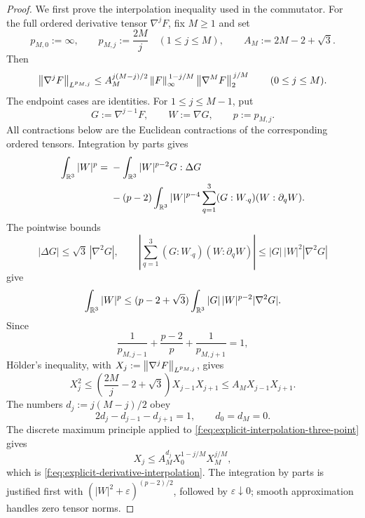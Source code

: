 \begin{proof}
We first prove the interpolation inequality used in the commutator.  For the
full ordered derivative tensor \(\nabla^jF\), fix \(M\ge1\) and set
\[
 p_{M,0}:=\infty,
 \qquad
 p_{M,j}:=\frac{2M}{j}\quad(1\le j\le M),
 \qquad
 A_M:=2M-2+\sqrt3.
\]
Then
\begin{equation}
 \left\lVert \nabla^jF\right\rVert_{L^{p_{M,j}}}
 \le A_M^{j(M-j)/2}
 \left\lVert F\right\rVert_\infty^{\,1-j/M}
 \left\lVert \nabla^MF\right\rVert_2^{\,j/M}
 \qquad(0\le j\le M).
 \label{f:eq:explicit-derivative-interpolation}
\end{equation}
The endpoint cases are identities.  For \(1\le j\le M-1\), put
\[
 G:=\nabla^{j-1}F,
 \qquad W:=\nabla G,
 \qquad p:=p_{M,j}.
\]
All contractions below are the Euclidean contractions of the corresponding
ordered tensors.  Integration by parts gives
\begin{align*}
 \int_{\mathbb R^3}|W|^p
 ={}&-\int_{\mathbb R^3}|W|^{p-2}G:\Delta G\\
 &-(p-2)\int_{\mathbb R^3}|W|^{p-4}
   \sum_{q=1}^3(G:W_{\cdot q})(W:\partial_qW).
\end{align*}
The pointwise bounds
\[
 |\Delta G|\le\sqrt3\,|\nabla^2G|,
 \qquad
 \left|\sum_{q=1}^3(G:W_{\cdot q})(W:\partial_qW)\right|
 \le |G|\,|W|^2|\nabla^2G|
\]
give
\[
 \int_{\mathbb R^3}|W|^p
 \le(p-2+\sqrt3)
 \int_{\mathbb R^3}|G|\,|W|^{p-2}|\nabla^2G|.
\]
Since
\[
 \frac1{p_{M,j-1}}+\frac{p-2}{p}
 +\frac1{p_{M,j+1}}=1,
\]
H\"older's inequality, with
\(
 X_j:=\left\lVert \nabla^jF\right\rVert_{L^{p_{M,j}}}
\), gives
\begin{equation}
 X_j^2
 \le\left(\frac{2M}{j}-2+\sqrt3\right)X_{j-1}X_{j+1}
 \le A_MX_{j-1}X_{j+1}.
 \label{f:eq:explicit-interpolation-three-point}
\end{equation}
The numbers \(d_j:=j(M-j)/2\) obey
\[
 2d_j-d_{j-1}-d_{j+1}=1,
 \qquad d_0=d_M=0.
\]
The discrete maximum principle applied to
\eqref{f:eq:explicit-interpolation-three-point} gives
\[
 X_j\le A_M^{d_j}X_0^{1-j/M}X_M^{j/M},
\]
which is \eqref{f:eq:explicit-derivative-interpolation}.  The integration by
parts is justified first with
\((|W|^2+\varepsilon)^{(p-2)/2}\), followed by
\(\varepsilon\downarrow0\); smooth approximation handles zero tensor norms.


\end{proof}
